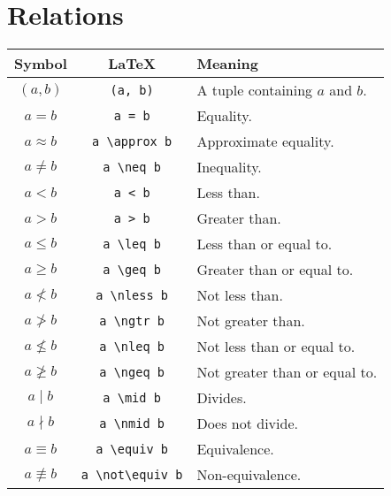 \documentclass{article}
\begin{document}
\section{Relations}

\renewcommand{\arraystretch}{1.2}
\begin{tabularx}{\textwidth}{ccX}
    Symbol & \LaTeX & Meaning \\
    \hline
    $(a, b)$ & \texttt{(a, b)} & A tuple containing $a$ and $b$. \\
    $a = b$ & \texttt{a = b} & Equality. \\
    $a \approx b$ & \texttt{a {\textbackslash}approx b} & Approximate equality. \\
    $a \neq b$ & \texttt{a {\textbackslash}neq b} & Inequality. \\
    $a < b$ & \texttt{a < b} & Less than. \\
    $a > b$ & \texttt{a > b} & Greater than. \\
    $a \leq b$ & \texttt{a {\textbackslash}leq b} & Less than or equal to. \\
    $a \geq b$ & \texttt{a {\textbackslash}geq b} & Greater than or equal to. \\
    $a \nless b$ & \texttt{a {\textbackslash}nless b} & Not less than. \\
    $a \ngtr b$ & \texttt{a {\textbackslash}ngtr b} & Not greater than. \\
    $a \nleq b$ & \texttt{a {\textbackslash}nleq b} & Not less than or equal to. \\
    $a \ngeq b$ & \texttt{a {\textbackslash}ngeq b} & Not greater than or equal to. \\
    $a \mid b$ & \texttt{a {\textbackslash}mid b} & Divides. \\
    $a \nmid b$ & \texttt{a {\textbackslash}nmid b} & Does not divide. \\
    $a \equiv b$ & \texttt{a {\textbackslash}equiv b} & Equivalence. \\
    $a \not\equiv b$ & \texttt{a {\textbackslash}not{\textbackslash}equiv b} & Non-equivalence. \\
\end{tabularx}
\end{document}
